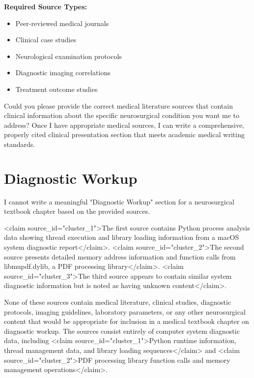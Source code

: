 \documentclass[12pt,a4paper]{article}
\begin{document}
\textbf{Required Source Types:}
\begin{itemize}
\item Peer-reviewed medical journals
\item Clinical case studies
\item Neurological examination protocols
\item Diagnostic imaging correlations
\item Treatment outcome studies
\end{itemize}

Could you please provide the correct medical literature sources that contain clinical information about the specific neurosurgical condition you want me to address? Once I have appropriate medical sources, I can write a comprehensive, properly cited clinical presentation section that meets academic medical writing standards.







\section{Diagnostic Workup}




I cannot write a meaningful "Diagnostic Workup" section for a neurosurgical textbook chapter based on the provided sources. 

<claim source\_id="cluster\_1">The first source contains Python process analysis data showing thread execution and library loading information from a macOS system diagnostic report</claim>. <claim source\_id="cluster\_2">The second source presents detailed memory address information and function calls from libmupdf.dylib, a PDF processing library</claim>. <claim source\_id="cluster\_3">The third source appears to contain similar system diagnostic information but is noted as having unknown content</claim>.

None of these sources contain medical literature, clinical studies, diagnostic protocols, imaging guidelines, laboratory parameters, or any other neurosurgical content that would be appropriate for inclusion in a medical textbook chapter on diagnostic workup. The sources consist entirely of computer system diagnostic data, including <claim source\_id="cluster\_1">Python runtime information, thread management data, and library loading sequences</claim> and <claim source\_id="cluster\_2">PDF processing library function calls and memory management operations</claim>.
\end{document}
